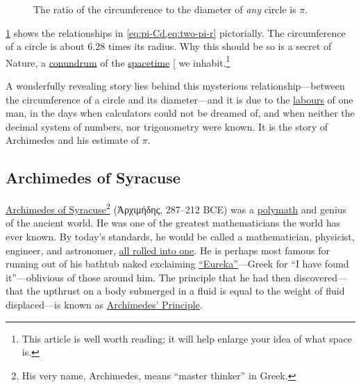 \documentclass[
  a4paper,
]{article}
\begin{document}
\begin{figure}
\centering

\caption{The ratio of the circumference to the diameter of \emph{any}
circle is \(\pi\).}\label{fig:pi-circle}
\end{figure}

\cref{fig:pi-circle} shows the relationships in
\cref{eq:pi-Cd,eq:two-pi-r} pictorially. The circumference of a circle
is about 6.28 times its radius. Why this should be so is a secret of
Nature, a \href{https://www.thefreedictionary.com/conundrum}{conundrum}
of the
\href{https://www.nature.com/articles/d41586-018-05095-z}{spacetime}
{[}\citeproc{ref-musser2018}{1}{]} we inhabit.\footnote{This article is
  well worth reading; it will help enlarge your idea of what space is.}

A wonderfully revealing story lies behind this mysterious
relationship---between the circumference of a circle and its
diameter---and it is due to the
\href{https://www.collinsdictionary.com/dictionary/english/labours}{labours}
of one man, in the days when calculators could not be dreamed of, and
when neither the decimal system of numbers, nor trigonometry were known.
It is the story of Archimedes and his estimate of \(\pi\).

\subsection{Archimedes of Syracuse}\label{archimedes-of-syracuse}

\href{https://en.wikipedia.org/wiki/Archimedes}{Archimedes of
Syracuse}\footnote{His very name, Archimedes, means ``master thinker''
  in Greek.} (Ἀρχιμήδης, 287--212 BCE) was a
\href{https://www.vocabulary.com/dictionary/polymath\#:~:text=Definitions\%20of\%20polymath,of\%20great\%20and\%20varied\%20learning}{polymath}
and genius of the ancient world. He was one of the greatest
mathematicians the world has ever known. By today's standards, he would
be called a mathematician, physicist, engineer, and astronomer,
\href{https://www.ldoceonline.com/dictionary/all-rolled-into-one}{all
rolled into one}. He is perhaps most famous for running out of his
bathtub naked exclaiming
\href{https://www.dictionary.com/browse/eureka}{``Eureka''}---Greek for
``I have found it''---oblivious of those around him. The principle that
he had then discovered---that the upthrust on a body submerged in a
fluid is equal to the weight of fluid displaced---is known as
\href{https://www.britannica.com/science/Archimedes-principle}{Archimedes'
Principle}.
\end{document}
